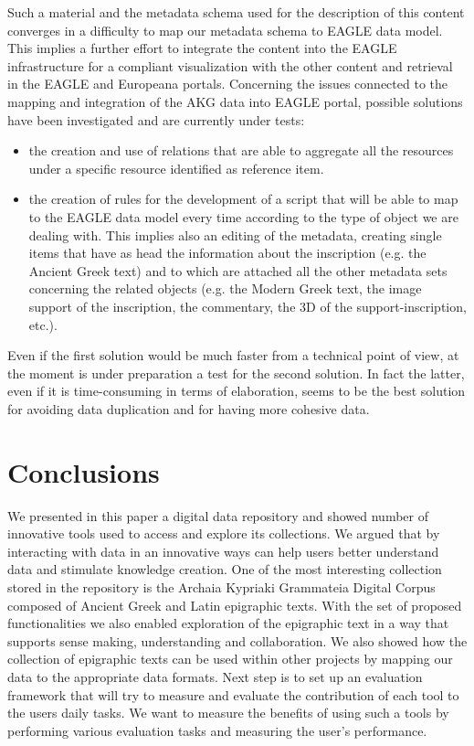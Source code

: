 \documentclass[amsthm,ebook]{saparticle}
\begin{document}
Such a material and the metadata schema used for the description of this content converges in a difficulty to map our
metadata schema to EAGLE data model. This implies a further effort to integrate the content into the EAGLE
infrastructure for a compliant visualization with the other content and retrieval in the EAGLE and Europeana portals.
Concerning the issues connected to the mapping and integration of the AKG data into EAGLE portal, possible solutions
have been investigated and are currently under tests:

\begin{itemize}
\item the creation and use of relations that are able to aggregate all the resources under a specific resource
identified as reference item.
\item the creation of rules for the development of a script that will be able to map to the EAGLE data model every time
according to the type of object we are dealing with. This implies also an editing of the metadata, creating single
items that have as head the information about the inscription (e.g. the Ancient Greek text) and to which are attached
all the other metadata sets concerning the related objects (e.g. the Modern Greek text, the image support of the
inscription, the commentary, the 3D of the support-inscription, etc.).
\end{itemize}
Even if the first solution would be much faster from a technical point of view, at the moment is under preparation a
test for the second solution. In fact the latter, even if it is time-consuming in terms of elaboration, seems to be the
best solution for avoiding data duplication and for having more cohesive data. 

\section{Conclusions}


We presented in this paper a digital data repository and showed number of innovative tools used to access and explore
its collections. We argued that by interacting with data in an
innovative ways can help users better understand data and stimulate knowledge creation. One of the most interesting collection stored in the repository is the Archaia Kypriaki Grammateia
Digital Corpus composed of Ancient Greek and Latin epigraphic texts. With the set of proposed
functionalities we also enabled exploration of the epigraphic text in a way that supports sense making, understanding
and collaboration. We also showed how the collection of epigraphic texts can be used within other projects by mapping
our data to the appropriate data formats. Next step is to set up an evaluation framework that will try to measure and
evaluate the contribution of each tool to the users daily tasks. We want to measure the benefits of using such a tools
by performing various evaluation tasks and measuring the user's performance. 




\end{document}
